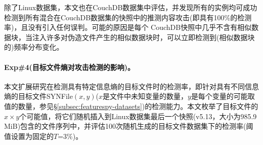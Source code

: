 除了Linux数据集，本文也在CouchDB数据集中评估\sysnameF，并发现所有\sysnameF 的实例均可成功检测到所有混合在CouchDB数据集的快照中的推测内容攻击(即具有100\%的检测率)，且没有引入任何误判。可能的原因是每个 CouchDB快照中几乎不含有相似数据块，当注入许多对伪造文件产生的相似数据块时，\sysnameF 可以立即检测到(相似数据块的)频率分布变化。

\paragraph*{Exp\#4(目标文件熵对攻击检测的影响)。}

本文扩展研究\sysnameF 在检测具有特定信息熵的目标文件时的检测率，即针对具有不同信息熵的目标文件SYNFile$(x, y)$($x$是文件中未知变量的数量，$y$是每个变量的可能取值的数量，参见\S\ref{subsec:featurespy-datasets})的检测能力。本文枚举了目标文件的$x\times y$个可能值，将它们随机插入到Linux数据集最后一个快照(v5.13，大小为985.9\,MiB)包含的文件序列中，并评估100次随机生成的目标文件数据集下\sysnameF 的检测率(阈值设置为固定的$T$=3\%)。

